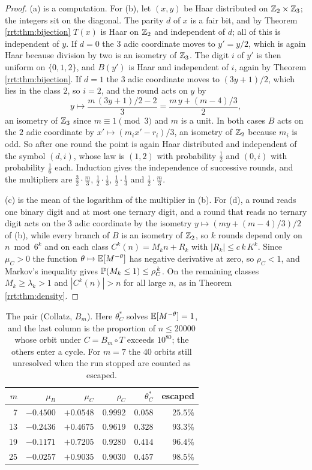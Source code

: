 \begin{proof}
(a) is a computation. For (b), let $(x,y)$ be Haar distributed on $\mathbb{Z}_2\times\mathbb{Z}_3$; the integers sit on the diagonal. The parity $d$ of $x$ is a fair bit, and by Theorem \ref{rrt:thm:bijection} $T(x)$ is Haar on $\mathbb{Z}_2$ and independent of $d$; all of this is independent of $y$. If $d=0$ the $3$ adic coordinate moves to $y'=y/2$, which is again Haar because division by two is an isometry of $\mathbb{Z}_3$. The digit $i$ of $y'$ is then uniform on $\{0,1,2\}$, and $B(y')$ is Haar and independent of $i$, again by Theorem \ref{rrt:thm:bijection}. If $d=1$ the $3$ adic coordinate moves to $(3y+1)/2$, which lies in the class $2$, so $i=2$, and the round acts on $y$ by
\[
y\longmapsto \frac{m\,(3y+1)/2-2}{3}=\frac{m\,y+(m-4)/3}{2},
\]
an isometry of $\mathbb{Z}_3$ since $m\equiv 1 \pmod 3$ and $m$ is a unit. In both cases $B$ acts on the $2$ adic coordinate by $x'\mapsto(m_i x'-r_i)/3$, an isometry of $\mathbb{Z}_2$ because $m_i$ is odd. So after one round the point is again Haar distributed and independent of the symbol $(d,i)$, whose law is $(1,2)$ with probability $\tfrac12$ and $(0,i)$ with probability $\tfrac16$ each. Induction gives the independence of successive rounds, and the multipliers are $\tfrac32\cdot\tfrac m3$, $\tfrac12\cdot\tfrac13$, $\tfrac12\cdot\tfrac13$ and $\tfrac12\cdot\tfrac m3$.

(c) is the mean of the logarithm of the multiplier in (b). For (d), a round reads one binary digit and at most one ternary digit, and a round that reads no ternary digit acts on the $3$ adic coordinate by the isometry $y\mapsto(my+(m-4)/3)/2$ of (b), while every branch of $B$ is an isometry of $\mathbb{Z}_2$, so $k$ rounds depend only on $n\bmod 6^k$ and on each class $C^k(n)=M_k n+R_k$ with $|R_k|\le c\,k\,K^k$. Since $\mu_C>0$ the function $\theta\mapsto\mathbb{E}[M^{-\theta}]$ has negative derivative at zero, so $\rho_C<1$, and Markov's inequality gives $\mathbb{P}(M_k\le 1)\le\rho_C^{\,k}$. On the remaining classes $M_k\ge\lambda_k>1$ and $|C^k(n)|>n$ for all large $n$, as in Theorem \ref{rrt:thm:density}.
\end{proof}

\begin{table}[t]
\centering
\small
\begin{tabular}{rrrrrr}
\toprule
$m$ & $\mu_B$ & $\mu_C$ & $\rho_C$ & $\theta^*_C$ & escaped\\
\midrule
7 & $-0.4500$ & $+0.0548$ & $0.9992$ & $0.058$ & $25.5\%$\\
13 & $-0.2436$ & $+0.4675$ & $0.9619$ & $0.328$ & $93.3\%$\\
19 & $-0.1171$ & $+0.7205$ & $0.9280$ & $0.414$ & $96.4\%$\\
25 & $-0.0257$ & $+0.9035$ & $0.9030$ & $0.457$ & $98.5\%$\\
\bottomrule
\end{tabular}
\caption{The pair (Collatz, $B_m$). Here $\theta^*_C$ solves $\mathbb{E}[M^{-\theta}]=1$, and the last column is the proportion of $n\le 20000$ whose orbit under $C=B_m\circ T$ exceeds $10^{80}$; the others enter a cycle. For $m=7$ the $40$ orbits still unresolved when the run stopped are counted as escaped.}
\label{rrt:tab:resonance}
\end{table}

